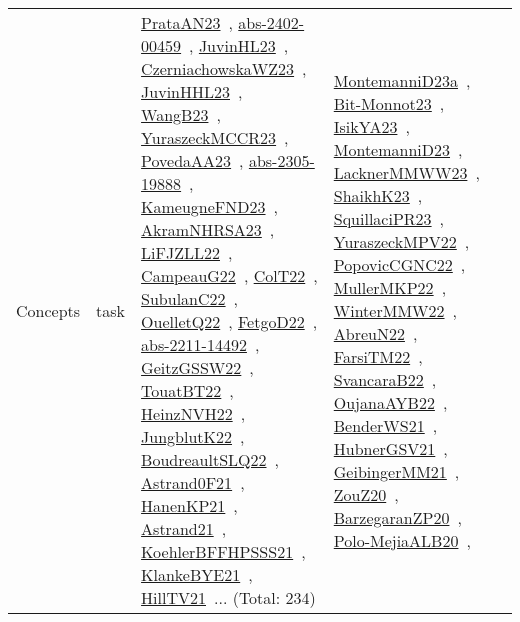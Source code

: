 {\begin{longtable}{lp{3cm}>{\raggedright\arraybackslash}p{6cm}>{\raggedright\arraybackslash}p{6cm}>{\raggedright\arraybackslash}p{8cm}}
Concepts & task & \href{works/PrataAN23.pdf}{PrataAN23}~\cite{PrataAN23}, \href{works/abs-2402-00459.pdf}{abs-2402-00459}~\cite{abs-2402-00459}, \href{works/JuvinHL23.pdf}{JuvinHL23}~\cite{JuvinHL23}, \href{works/CzerniachowskaWZ23.pdf}{CzerniachowskaWZ23}~\cite{CzerniachowskaWZ23}, \href{works/JuvinHHL23.pdf}{JuvinHHL23}~\cite{JuvinHHL23}, \href{works/WangB23.pdf}{WangB23}~\cite{WangB23}, \href{works/YuraszeckMCCR23.pdf}{YuraszeckMCCR23}~\cite{YuraszeckMCCR23}, \href{works/PovedaAA23.pdf}{PovedaAA23}~\cite{PovedaAA23}, \href{works/abs-2305-19888.pdf}{abs-2305-19888}~\cite{abs-2305-19888}, \href{works/KameugneFND23.pdf}{KameugneFND23}~\cite{KameugneFND23}, \href{works/AkramNHRSA23.pdf}{AkramNHRSA23}~\cite{AkramNHRSA23}, \href{works/LiFJZLL22.pdf}{LiFJZLL22}~\cite{LiFJZLL22}, \href{works/CampeauG22.pdf}{CampeauG22}~\cite{CampeauG22}, \href{works/ColT22.pdf}{ColT22}~\cite{ColT22}, \href{works/SubulanC22.pdf}{SubulanC22}~\cite{SubulanC22}, \href{works/OuelletQ22.pdf}{OuelletQ22}~\cite{OuelletQ22}, \href{works/FetgoD22.pdf}{FetgoD22}~\cite{FetgoD22}, \href{works/abs-2211-14492.pdf}{abs-2211-14492}~\cite{abs-2211-14492}, \href{works/GeitzGSSW22.pdf}{GeitzGSSW22}~\cite{GeitzGSSW22}, \href{works/TouatBT22.pdf}{TouatBT22}~\cite{TouatBT22}, \href{works/HeinzNVH22.pdf}{HeinzNVH22}~\cite{HeinzNVH22}, \href{works/JungblutK22.pdf}{JungblutK22}~\cite{JungblutK22}, \href{works/BoudreaultSLQ22.pdf}{BoudreaultSLQ22}~\cite{BoudreaultSLQ22}, \href{works/Astrand0F21.pdf}{Astrand0F21}~\cite{Astrand0F21}, \href{works/HanenKP21.pdf}{HanenKP21}~\cite{HanenKP21}, \href{works/Astrand21.pdf}{Astrand21}~\cite{Astrand21}, \href{works/KoehlerBFFHPSSS21.pdf}{KoehlerBFFHPSSS21}~\cite{KoehlerBFFHPSSS21}, \href{works/KlankeBYE21.pdf}{KlankeBYE21}~\cite{KlankeBYE21}, \href{works/HillTV21.pdf}{HillTV21}~\cite{HillTV21}... (Total: 234) & \href{works/MontemanniD23a.pdf}{MontemanniD23a}~\cite{MontemanniD23a}, \href{works/Bit-Monnot23.pdf}{Bit-Monnot23}~\cite{Bit-Monnot23}, \href{works/IsikYA23.pdf}{IsikYA23}~\cite{IsikYA23}, \href{works/MontemanniD23.pdf}{MontemanniD23}~\cite{MontemanniD23}, \href{works/LacknerMMWW23.pdf}{LacknerMMWW23}~\cite{LacknerMMWW23}, \href{works/ShaikhK23.pdf}{ShaikhK23}~\cite{ShaikhK23}, \href{works/SquillaciPR23.pdf}{SquillaciPR23}~\cite{SquillaciPR23}, \href{works/YuraszeckMPV22.pdf}{YuraszeckMPV22}~\cite{YuraszeckMPV22}, \href{works/PopovicCGNC22.pdf}{PopovicCGNC22}~\cite{PopovicCGNC22}, \href{works/MullerMKP22.pdf}{MullerMKP22}~\cite{MullerMKP22}, \href{works/WinterMMW22.pdf}{WinterMMW22}~\cite{WinterMMW22}, \href{works/AbreuN22.pdf}{AbreuN22}~\cite{AbreuN22}, \href{works/FarsiTM22.pdf}{FarsiTM22}~\cite{FarsiTM22}, \href{works/SvancaraB22.pdf}{SvancaraB22}~\cite{SvancaraB22}, \href{works/OujanaAYB22.pdf}{OujanaAYB22}~\cite{OujanaAYB22}, \href{works/BenderWS21.pdf}{BenderWS21}~\cite{BenderWS21}, \href{works/HubnerGSV21.pdf}{HubnerGSV21}~\cite{HubnerGSV21}, \href{works/GeibingerMM21.pdf}{GeibingerMM21}~\cite{GeibingerMM21}, \href{works/ZouZ20.pdf}{ZouZ20}~\cite{ZouZ20}, \href{works/BarzegaranZP20.pdf}{BarzegaranZP20}~\cite{BarzegaranZP20}, \href{works/Polo-MejiaALB20.pdf}{Polo-MejiaALB20}~\cite{Polo-MejiaALB20}, 
\end{longtable}}
